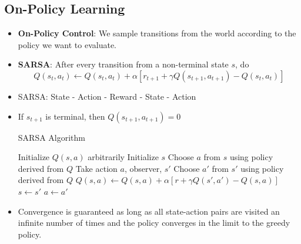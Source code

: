 \documentclass[a4paper]{article}
\begin{document}
\subsection{On-Policy Learning}
\begin{itemize}
    \item \textbf{On-Policy Control}: We sample transitions from the world according to the policy we want to evaluate.
    \item \textbf{SARSA}: After every transition from a non-terminal state $s$, do
    \begin{equation*}
        Q(s_t,a_t)\gets Q(s_t,a_t)+\alpha[r_{t+1}+\gamma Q(s_{t+1},a_{t+1})-Q(s_t,a_t)]
    \end{equation*}
    \item SARSA: State - Action - Reward - State - Action
    \item If $s_{t+1}$ is terminal, then $Q(s_{t+1},a_{t+1})=0$
    \begin{algorithm}[H]
        \caption{SARSA Algorithm}
        \begin{algorithmic}[1]
            \State Initialize $Q(s,a)$ arbitrarily
                \State Initialize $s$
                \State Choose $a$ from $s$ using policy derived from $Q$
                \Repeat
                    \State Take action $a$, observer, $s'$
                    \State Choose $a'$ from $s'$ using policy derived from $Q$
                    \State $Q(s,a)\gets Q(s,a)+\alpha[r+\gamma Q(s',a')-Q(s,a)]$
                    \State $s\gets s'$
                    \State $a\gets a'$
            \EndFor
        \end{algorithmic}
    \end{algorithm}
    \item Convergence is guaranteed as long as all state-action pairs are visited an infinite number of times and the policy converges in the limit to the greedy policy.
\end{itemize}
\end{document}
